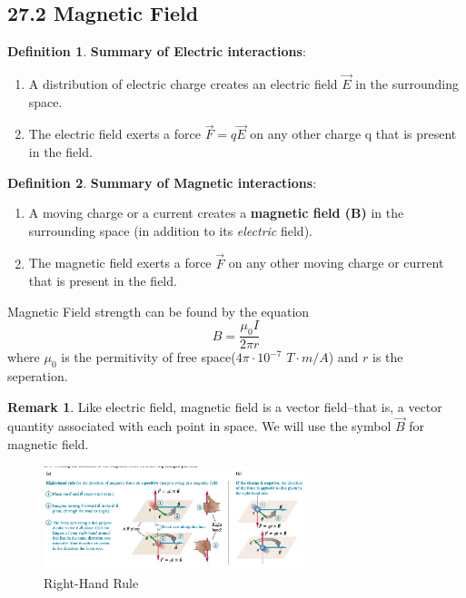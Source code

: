 \documentclass[12pt]{amsart}
\theoremstyle{definition}
\newtheorem{definition}{Definition} %
\newtheorem*{remark}{Remark}        %
\numberwithin{equation}{theorem}    %
\begin{document}
\subsection*{27.2 Magnetic Field}

\begin{definition}
    \textbf{Summary of Electric interactions}:
    \begin{enumerate}
        \item A distribution of electric charge creates an electric field $\vec{E}$ in the surrounding space.
        \item The electric field exerts a force $\vec{F} = q\vec{E}$ on any other charge q that is present in the field.
    \end{enumerate}
\end{definition}

\begin{definition}
    \textbf{Summary of Magnetic interactions}:
    \begin{enumerate}
        \item A moving charge or a current creates a \textbf{magnetic field (B)} in the surrounding
        space (in addition to its \textit{electric} field).
        \item  The magnetic field exerts a force $\vec{F}$ on any other moving charge or current that is present in the field.
    \end{enumerate}

    Magnetic Field strength can be found by the equation 
    $$B = \frac{\mu_0I}{2\pi r}$$ where $\mu_0$ is the permitivity of free space($4\pi \cdot 10^{-7}$ $T\cdot m/A$) and $r$ is the seperation.

    \begin{remark}
        Like electric field, magnetic field is a vector field--that is, a vector quantity associated with each point in space. We will use the symbol $\vec{B}$ for magnetic field.
    \end{remark}
\end{definition}

\begin{figure}[H]
    \centering
    \includegraphics[width=3in]{Media/RHR.png}
    \caption{Right-Hand Rule}
    \label{Right-Hand Rule}
\end{figure}
\end{document}
